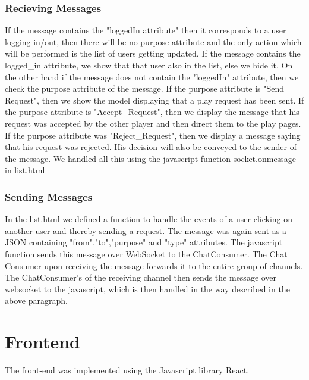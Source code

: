 \documentclass[titlepage]{article}
\begin{document}
\subsubsection{Recieving Messages}
If the message contains the "loggedIn attribute" then it corresponds to a user logging in/out, then there will be no purpose attribute and the only action which will be performed is the list of users getting updated. If the message contains the logged\_in attribute, we show that that user also in the list, else we hide it.  On the other hand if the message does not contain the "loggedIn" attribute, then we check the purpose attribute of the message. If the purpose attribute is "Send Request", then we show the model displaying that a play request has been sent. If the purpose attribute is "Accept\_Request", then we display the message that his request was accepted by the other player and then direct them to the play pages. If the purpose attribute was "Reject\_Request", then we display a message saying that his request was rejected.  His decision will also be conveyed to the sender of the message. We handled all this using the javascript function socket.onmessage in list.html

\subsubsection{Sending Messages}
In the list.html we defined a function to handle the events of a user clicking on another user and thereby sending a request. The message was again sent as a JSON containing "from","to","purpose" and "type" attributes. The javascript function sends this message over WebSocket to the ChatConsumer. The Chat Consumer upon receiving the message forwards it to the entire group of channels. The ChatConsumer's of the receiving channel then sends the message over websocket to the javascript, which is then handled in the way described in the above paragraph.

\section{Frontend}
The front-end was implemented using the Javascript library React. 
\end{document}

